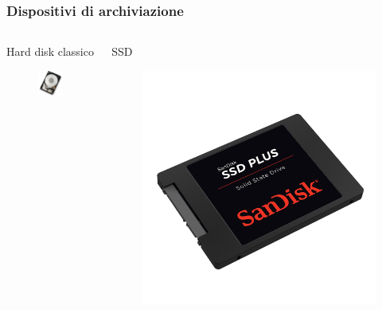 \documentclass[]{beamer}
\begin{document}
\begin{frame}
\frametitle{Dispositivi di archiviazione}
\begin{columns}
\begin{column}{.3\textwidth}
  \begin{center}
    Hard disk classico
    \begin{figure}
      \includegraphics[width=\columnwidth]{img/hdd.jpg}
    \end{figure}
  \end{center}
\end{column}
\begin{column}{.3\textwidth}
  \begin{center}
    SSD
    \begin{figure}
      \includegraphics[width=\columnwidth]{img/ssd.png}

\end{figure}
\end{center}
\end{column}
\end{columns}
\end{frame}
\end{document}
